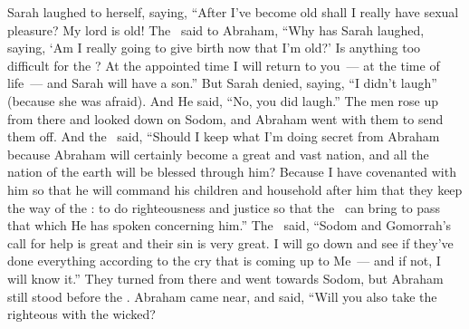 \begin{inparaenum}
   Sarah laughed to herself, saying, ``After I've become old shall I really have sexual pleasure? My lord is old!%
   The \lord\ said to Abraham, ``Why has Sarah laughed, saying, `Am I really going to give birth now that I'm old?'%
   Is anything too difficult for the \lord? At the appointed time I will return to you~--- at the time of life~--- and Sarah will have a son.''%
   But Sarah denied, saying, ``I didn't laugh'' (because she was afraid). And He said, ``No, you did laugh.''%
   The men rose up from there and looked down on Sodom, and Abraham went with them to send them off.%
   And the \lord\ said, ``Should I keep what I'm doing secret from Abraham%
   because Abraham will certainly become a great and vast nation, and all the nation of the earth will be blessed through him?%
   Because I have covenanted with him so that he will command his children and household after him that they keep the way of the \lord: to do righteousness and justice so that the \lord\ can bring to pass that which He has spoken concerning him.''%
   The \lord\ said, ``Sodom and Gomorrah's call for help is great and their sin is very great.%
   I will go down and see if they've done everything according to the cry that is coming up to Me~--- and if not, I will know it.''%
   They turned from there and went towards Sodom, but Abraham still stood before the \lord.%
   Abraham came near, and said, ``Will you also take the righteous with the wicked?%

\end{inparaenum}

